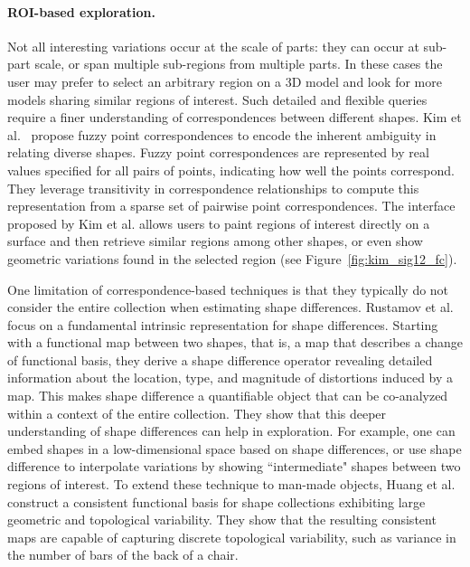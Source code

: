 \paragraph*{ROI-based exploration.}
Not all interesting variations occur at the scale of parts: they can occur at sub-part scale, or span multiple sub-regions from multiple parts. In these cases the user may prefer to select an arbitrary region on a 3D model and look for more models sharing similar regions of interest. Such detailed and flexible queries require a finer understanding of correspondences between different shapes. Kim et al.~\cite{Kim:2012:FC} propose fuzzy point correspondences to encode the inherent ambiguity in relating diverse shapes. Fuzzy point correspondences are represented by real values specified for all pairs of points, indicating how well the points correspond.  They leverage transitivity in correspondence relationships to compute this representation from a sparse set of pairwise point correspondences.  The interface proposed by Kim et al. allows users to paint regions of interest directly on a surface and then retrieve similar regions among other shapes, or even show geometric variations found in the selected region (see Figure~\ref{fig:kim_sig12_fc}).


One limitation of correspondence-based techniques is that they typically do not consider the entire collection when estimating shape differences.  Rustamov et al.~\cite{Rustamov:2013:SD} focus on a fundamental intrinsic representation for shape differences.  Starting with a functional map between two shapes, that is, a map that describes a change of functional basis, they derive a shape difference operator revealing detailed information about the location, type, and magnitude of distortions induced by a map. This makes shape difference a quantifiable object that can be co-analyzed within a context of the entire collection. They show that this deeper understanding of shape differences can help in exploration. For example, one can embed shapes in a low-dimensional space based on shape differences, or use shape difference to interpolate variations by showing ``intermediate" shapes between two regions of interest.
%
To extend these technique to man-made objects, Huang et al.~\cite{Huang:2014:FMN} construct a consistent functional basis for shape collections exhibiting large geometric and topological variability. They show that the resulting consistent maps are capable of capturing discrete topological variability, such as variance in the number of bars of the back of a chair.

